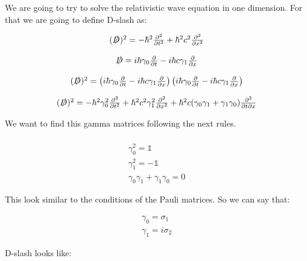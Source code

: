We are going to try to solve the relativistic wave equation in one dimension. For that we are going to define D-slash as:

\begin{equation}
  \begin{array}{c}
    (\slashed{D})^2 = -\hbar^2 \frac{\partial^2}{\partial t^2} + \hbar^2 c^2 \frac{\partial^2}{\partial x^2}
    \\

    \\
    \slashed{D} = i\hbar\gamma_0 \frac{\partial}{\partial t}-i\hbar c \gamma_1 \frac{\partial}{\partial x}
    \\

    \\
    (\slashed{D})^2 = \left(i\hbar\gamma_0\frac{\partial}{\partial t}-i\hbar c\gamma_1\frac{\partial}{\partial x}\right)\left(i\hbar\gamma_0\frac{\partial}{\partial t}-i\hbar c\gamma_1\frac{\partial}{\partial x}\right)
    \\

    \\
    (\slashed{D})^2 = -\hbar^2 \gamma_0^2 \frac{\partial^2}{\partial t^2} + \hbar^2 c^2 \gamma_1^2 \frac{\partial^2}{\partial x^2} + \hbar^2 c (\gamma_0\gamma_1 + \gamma_1\gamma_0)\frac{\partial^2}{\partial t \partial x}
  \end{array}
\end{equation}

We want to find this  gamma matrices following the next rules.

\begin{equation}
  \begin{array}{c}
    \\
    \gamma_0^2 = \mathbb{1}
    \\
    \gamma_1^2 = -\mathbb{1}
    \\
    \gamma_0\gamma_1 + \gamma_1\gamma_0 = 0
  \end{array}
\end{equation}

This look similar to the conditions of the Pauli matrices. So we can say that:

\begin{equation}
  \begin{array}{c}
    \gamma_0 = \sigma_1
    \\
    \gamma_1 = i\sigma_2
  \end{array}
\end{equation}

D-slash looks like:

